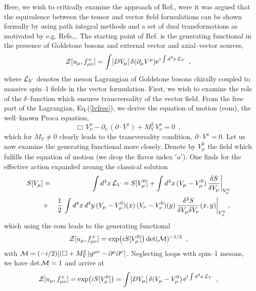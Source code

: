 Here, we wish to critically examine the approach of Ref.\cite{bp}, were it was
argued that the equivalence between the  tensor and vector field formulations
can be shown formally by using path integral methods and a set of dual
transformations as motivated by e.g. Refs.\cite{dual1},\cite{dual2}.
The starting point of Ref.\cite{bp}
is the generating functional in the presence of Goldstone bosons and
external vector and axial--vector sources,
\begin{equation}
{\cal Z}[u_\mu , f^+_{\mu \nu}] = \int [DV_\mu] \, \delta(\partial_\mu V^\mu)
{\rm e}^{i \int d^4x \, {\cal L}_V } \, \, \, ,
\label{bpstart}
\end{equation}
where ${\cal L}_V$ denotes the meson Lagrangian of Goldstone bosons chirally
coupled to massive spin--1 fields in the vector formulation. First, we wish to
examine the role of the $\delta$--function which ensures transversality of the
vector field. From the free part of the Lagrangian, Eq.(\ref{lvfree}),
we derive the
equation of motion (eom), the well--known Proca equation,
\begin{equation}
\Box \, V_\nu^a - \partial_\nu \, (\partial \cdot V^a) + M_V^2 \, V_\nu^a = 0
\, \, \, ,
\label{proca}
\end{equation}
which for $M_V \neq 0$ clearly leads to the transversality condition, $\partial
\cdot V^a = 0$.  Let us now examine the generating functional more closely.
Denote by  $V_\mu^0$ the field which fulfills the equation of motion
(we drop the flavor index $'a'$). One finds for the effective action
expanded aroung the classical solution
\begin{eqnarray}
S[V_\mu] &=& \int d^4x \, {\cal L}_V= S[V_\mu^0] + \int d^4 x \,
(V_\mu - V_\mu^0) \, \frac{\delta S}{\delta V_\mu}\biggl|_{V_\mu^0}
\nonumber \\
& + & \frac{1}{2} \,  \int d^4 x \, d^4 y \, (V_\mu - V_\mu^0) (x) \,
(V_\nu - V_\nu^0) (y) \,
\frac{\delta^2 S}{\delta V_\mu \delta V_\nu} (x,y)\biggr|_{V_\mu^0} \, \, ,
\end{eqnarray}
which using the eom leads to the generating functional
\begin{equation}
{\cal Z}[u_\mu, f^+_{\mu \nu}] = \exp\bigl(i S[V_\mu^0] \bigr) \, {\rm det}
({\cal M})^{-1/2} \, \, \, ,
\end{equation}
with ${\cal M} = (-i/2)[(\Box+M_V^2)g^{\mu \nu} - \partial^\mu \partial^\nu]$.
Neglecting loops with spin--1 mesons, we have det$\, {\cal M} =1$ and arrive at
\begin{equation}
{\cal Z}[u_\mu, f^+_{\mu \nu}] = \exp\bigl(i S[V_\mu^0] \bigr)
= \int [DV_\mu] \, \delta(V_\mu - V_\mu^0) \,
{\rm e}^{i \int d^4x \, {\cal L}_V} \, \, \, ,
\label{bmstart}
\end{equation}
